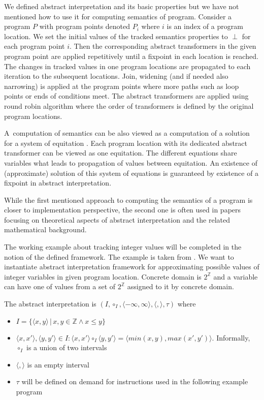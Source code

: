 \documentclass[a4paper, 12pt]{article}
\newcommand{\interval}[2]{\langle #1,#2 \rangle}
\newcommand{\ainf}[0]{\perp}
\newcommand{\atrans}[0]{\tau}
\newcommand{\ajoin}[0]{\circ}
\newcommand{\intg}[0]{\mathbb{Z}}
\newcommand{\iintg}[0]{I}
\newcommand{\ijoin}[0]{\ajoin_\iintg}
\begin{document}
We defined abstract interpretation and its basic properties
but we have not mentioned how to use it for computing
semantics of program.
Consider a program $P$ with program points denoted $P_i$
where $i$ is an index of a program location.
We set the initial values of the tracked semantics properties
to $\ainf$ for each program point $i$.
Then the corresponding abstract transformers in the given program point
are applied repetitively until a fixpoint in each location is reached.
The changes in tracked values in one program locations are propagated to each
iteration to the subsequent locations.
Join, widening (and if needed also narrowing) is applied at the program points
where more paths such as loop points or ends of conditions meet.
The abstract transformers are applied using round robin algorithm where
the order of transformers is defined by the original program locations.

A~computation of semantics can be also viewed as a computation of
a solution for a system of equitation \cite{cousot81}.
Each program location with its dedicated abstract transformer can be viewed
as one equitation.
The different equations share variables what leads to propagation
of values between equitation.
An existence of (approximate) solution of this system of equations
is guaranteed by existence of a fixpoint in abstract interpretation.

While the first mentioned approach to computing the semantics of a program is
closer to implementation perspective, the second one is often used in papers
focusing on theoretical aspects of abstract interpretation and
the related mathematical background.

\bexmp
The working example about tracking integer values will be completed
in the notion of the defined framework.
The example is taken from \cite{popl77}.
We want to instantiate abstract interpretation framework for approximating
possible values of integer variables in given program location.
Concrete domain is $2^\mathbb{\intg}$ and a variable can have one of values
from a set of $2^\mathbb{\intg}$ assigned to it by concrete domain.

The abstract interpretation is $(\iintg, \ijoin, \interval{-\infty}{\infty}, \interval{}{}, \atrans)$ where 
\begin{itemize}
	\item $\iintg = \{\interval{x}{y} \,|\, x,y \in \intg \wedge x \leq y\}$
	\item $\interval{x}{x'}, \interval{y}{y'} \in \iintg: \interval{x}{x'} \ijoin \interval{y}{y'}
		= \interval{min(x,y)}{max(x',y')}$. Informally, $\ijoin$ is a union of two intervals
	\item $\interval{}{}$ is an empty interval
	\item $\atrans$ will be defined on demand for instructions used in the following example program
\end{itemize}
\end{document}
